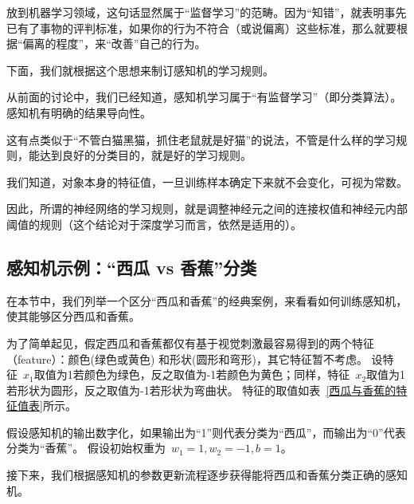%

放到机器学习领域，这句话显然属于“监督学习”的范畴。因为“知错”，就表明事先已有了事物的评判标准，如果你的行为不符合（或说偏离）这些标准，那么就要根据“偏离的程度”，来“改善”自己的行为。

下面，我们就根据这个思想来制订感知机的学习规则。

从前面的讨论中，我们已经知道，感知机学习属于“有监督学习”（即分类算法）。感知机有明确的结果导向性。

这有点类似于“不管白猫黑猫，抓住老鼠就是好猫”的说法，不管是什么样的学习规则，能达到良好的分类目的，就是好的学习规则。

我们知道，对象本身的特征值，一旦训练样本确定下来就不会变化，可视为常数。

因此，所谓的神经网络的学习规则，就是调整神经元之间的连接权值和神经元内部阈值的规则（这个结论对于深度学习而言，依然是适用的）。

\subsection{感知机示例：“西瓜 vs 香蕉”分类}

在本节中，我们列举一个区分“西瓜和香蕉”的经典案例，来看看如何训练感知机，使其能够区分西瓜和香蕉。 

为了简单起见，假定西瓜和香蕉都仅有基于视觉刺激最容易得到的两个特征（feature）：颜色(绿色或黄色) 和形状(圆形和弯形)，其它特征暂不考虑。
设特征~$x_1$取值为1若颜色为绿色，反之取值为-1若颜色为黄色；同样，特征~$x_2$取值为1若形状为圆形，反之取值为-1若形状为弯曲状。 特征的取值如表~\ref{西瓜与香蕉的特征值表}所示。

假设感知机的输出数字化，如果输出为“1”则代表分类为“西瓜”，而输出为“0”代表分类为“香蕉”。
假设初始权重为~$w_1 =1, w_2 =-1, b =1$。

接下来，我们根据感知机的参数更新流程逐步获得能将西瓜和香蕉分类正确的感知机。

